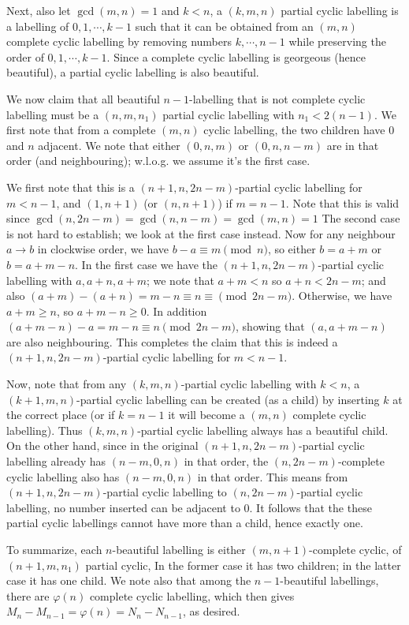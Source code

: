 \documentclass[11pt,a4paper]{article}
\begin{document}
\begin{enumerate}
	Next, also let $\gcd(m, n) = 1$ and $k < n$, a $(k, m, n)$ partial cyclic labelling is a labelling of $0, 1, \cdots, k - 1$ such that it can be obtained from an $(m, n)$ complete cyclic labelling by removing numbers $k, \cdots, n - 1$ while preserving the order of $0, 1, \cdots, k - 1$. 
	Since a complete cyclic labelling is georgeous (hence beautiful), a partial cyclic labelling is also beautiful. 
	
	We now claim that all beautiful $n - 1$-labelling that is not complete cyclic labelling must be a $(n, m, n_1)$ partial cyclic labelling with $n_1 < 2(n - 1)$. 
	We first note that from a complete $(m, n)$ cyclic labelling, the two children have $0$ and $n$ adjacent. 
	We note that either $(0, n, m)$ or $(0, n, n - m)$ are in that order (and neighbouring); 
	w.l.o.g. we assume it's the first case. 
	
	We first note that this is a $(n + 1, n, 2n - m)$-partial cyclic labelling for $m < n - 1$, 
	and $(1, n + 1)$ (or $(n, n + 1)$) if $m = n - 1$. 
	Note that this is valid since $\gcd(n, 2n - m) = \gcd(n, n - m) = \gcd(m, n) = 1$
	The second case is not hard to establish; 
	we look at the first case instead. 
	Now for any neighbour $a\to b$ in clockwise order, we have $b - a\equiv m\pmod{n}$, 
	so either $b = a + m$ or $b = a +m - n$. 
	In the first case we have the $(n + 1, n, 2n - m)$-partial cyclic labelling with 
	$a, a + n, a + m$; 
	we note that $a + m < n$ so $a + n < 2n - m$; 
	and also $(a + m) - (a + n) = m - n\equiv n\equiv \pmod{2n - m}$. 
	Otherwise, we have $a + m\ge n$, so $a + m - n \ge 0$. 
	In addition $(a + m - n) - a = m - n\equiv n\pmod{2n - m}$, 
	showing that $(a, a + m - n)$ are also neighbouring. 
	This completes the claim that this is indeed a $(n + 1, n, 2n - m)$-partial cyclic labelling for $m < n - 1$. 
	
	Now, note that from any $(k, m, n)$-partial cyclic labelling with $k < n$, 
	a $(k + 1, m, n)$-partial cyclic labelling can be created (as a child) by inserting $k$ at the correct place 
	(or if $k = n - 1$ it will become a $(m, n)$ complete cyclic labelling). 
	Thus $(k, m, n)$-partial cyclic labelling always has a beautiful child. 
	On the other hand, since in the original $(n + 1, n, 2n - m)$-partial cyclic labelling already has $(n - m, 0, n)$ in that order, 
	the $(n, 2n - m)$-complete cyclic labelling also has $(n - m, 0, n)$ in that order. 
	This means from $(n + 1, n, 2n - m)$-partial cyclic labelling to 
	$(n, 2n - m)$-partial cyclic labelling, no number inserted can be adjacent to $0$. 
	It follows that the these partial cyclic labellings cannot have more than a child, 
	hence exactly one. 
	
	To summarize, each $n$-beautiful labelling is either $(m, n + 1)$-complete cyclic, 
	of $(n + 1, m, n_1)$ partial cyclic, 
	In the former case it has two children; in the latter case it has one child. 
	We note also that among the $n - 1$-beautiful labellings, there are $\varphi(n)$ complete cyclic labelling, 
	which then gives $M_n - M_{n - 1} = \varphi(n) = N_n - N_{n - 1}$, 
	as desired. 
		
\end{enumerate}
\end{document}
